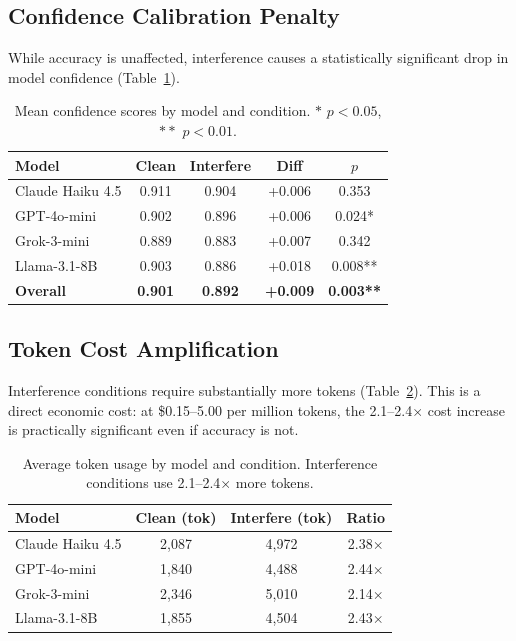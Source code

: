 \documentclass[11pt]{article}
\begin{document}
\subsection{Confidence Calibration Penalty}

While accuracy is unaffected, interference causes a statistically significant drop in model confidence (Table~\ref{tab:confidence}).

\begin{table}[t]
\centering
\small
\begin{tabular}{lcccc}
\toprule
\textbf{Model} & \textbf{Clean} & \textbf{Interfere} & \textbf{Diff} & \textbf{$p$} \\
\midrule
Claude Haiku 4.5 & 0.911 & 0.904 & +0.006 & 0.353 \\
GPT-4o-mini & 0.902 & 0.896 & +0.006 & 0.024* \\
Grok-3-mini & 0.889 & 0.883 & +0.007 & 0.342 \\
Llama-3.1-8B & 0.903 & 0.886 & +0.018 & 0.008** \\
\midrule
\textbf{Overall} & \textbf{0.901} & \textbf{0.892} & \textbf{+0.009} & \textbf{0.003**} \\
\bottomrule
\end{tabular}
\caption{Mean confidence scores by model and condition. $*$ $p < 0.05$, $**$ $p < 0.01$.}
\label{tab:confidence}
\end{table}

\subsection{Token Cost Amplification}

Interference conditions require substantially more tokens (Table~\ref{tab:tokens}). This is a direct economic cost: at \$0.15--5.00 per million tokens, the 2.1--2.4$\times$ cost increase is practically significant even if accuracy is not.

\begin{table}[t]
\centering
\small
\begin{tabular}{lccc}
\toprule
\textbf{Model} & \textbf{Clean (tok)} & \textbf{Interfere (tok)} & \textbf{Ratio} \\
\midrule
Claude Haiku 4.5 & 2,087 & 4,972 & 2.38$\times$ \\
GPT-4o-mini & 1,840 & 4,488 & 2.44$\times$ \\
Grok-3-mini & 2,346 & 5,010 & 2.14$\times$ \\
Llama-3.1-8B & 1,855 & 4,504 & 2.43$\times$ \\
\bottomrule
\end{tabular}
\caption{Average token usage by model and condition. Interference conditions use 2.1--2.4$\times$ more tokens.}
\label{tab:tokens}
\end{table}
\end{document}
